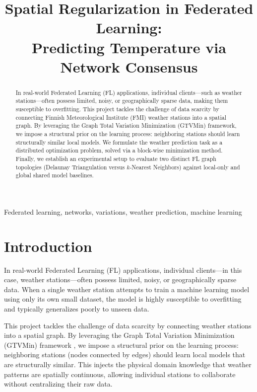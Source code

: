 \documentclass{article}
\title{Spatial Regularization in Federated Learning: \\ Predicting Temperature via Network Consensus}
\begin{document}
\maketitle

\begin{abstract}
In real-world Federated Learning (FL) applications, individual clients---such as weather stations---often possess limited, noisy, or geographically sparse data, making them susceptible to overfitting. This project tackles the challenge of data scarcity by connecting Finnish Meteorological Institute (FMI) weather stations into a spatial graph. By leveraging the Graph Total Variation Minimization (GTVMin) framework, we impose a structural prior on the learning process: neighboring stations should learn structurally similar local models. We formulate the weather prediction task as a distributed optimization problem, solved via a block-wise minimization method. Finally, we establish an experimental setup to evaluate two distinct FL graph topologies (Delaunay Triangulation versus $k$-Nearest Neighbors) against local-only and global shared model baselines.
\end{abstract}

\begin{keywords}
Federated learning, networks, variations, weather prediction, machine learning
\end{keywords}

\section{Introduction}
\label{sec:intro}

In real-world Federated Learning (FL) \cite{AaltoDictML} applications, individual clients---in this case, weather stations---often possess limited, noisy, or geographically sparse data. When a single weather station attempts to train a machine learning model using only its own small dataset, the model is highly susceptible to overfitting and typically generalizes poorly to unseen data.

This project tackles the challenge of data scarcity by connecting weather stations into a spatial graph. By leveraging the Graph Total Variation Minimization (GTVMin) framework \cite{Jung2025}, we impose a structural prior on the learning process: neighboring stations (nodes connected by edges) should learn local models that are structurally similar. This injects the physical domain knowledge that weather patterns are spatially continuous, allowing individual stations to collaborate without centralizing their raw data. 
\end{document}
